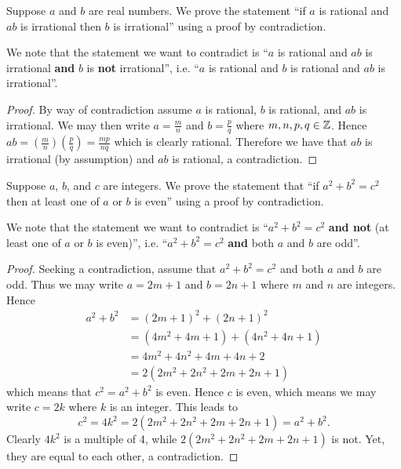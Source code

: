 \begin{example}
    Suppose $a$ and $b$ are real numbers. We prove the statement ``if $a$ is rational and $ab$ is irrational then $b$ is irrational'' using a proof by contradiction.

    We note that the statement we want to contradict is ``$a$ is rational and $ab$ is irrational \textbf{and} $b$ is \textbf{not} irrational'', i.e. ``$a$ is rational and $b$ is rational and $ab$ is irrational''.
    \begin{proof}
        By way of contradiction assume $a$ is rational, $b$ is rational, and $ab$ is irrational. We may then write $a = \frac mn$ and $b = \frac pq$ where $m, n, p, q \in \mathbb{Z}$. Hence $ab = \left(\frac mn\right)\left(\frac pq\right) = \frac{mp}{nq}$ which is clearly rational. Therefore we have that $ab$ is irrational (by assumption) and $ab$ is rational, a contradiction.
    \end{proof}
\end{example}

\begin{example}
    Suppose $a$, $b$, and $c$ are integers. We prove the statement that ``if $a^2 + b^2 = c^2$ then at least one of $a$ or $b$ is even'' using a proof by contradiction.

    We note that the statement we want to contradict is ``$a^2 + b^2 = c^2$ \textbf{and not} (at least one of $a$ or $b$ is even)'', i.e. ``$a^2 + b^2 = c^2$ \textbf{and} both $a$ and $b$ are odd''.
    \begin{proof}
        Seeking a contradiction, assume that $a^2 + b^2 = c^2$ and both $a$ and $b$ are odd. Thus we may write $a = 2m + 1$ and $b = 2n + 1$ where $m$ and $n$ are integers. Hence
        \begin{align*}
            a^2 + b^2 &= (2m+1)^2 + (2n+1)^2\\
            &= (4m^2+4m+1) + (4n^2+4n+1)\\
            &= 4m^2 + 4n^2 + 4m + 4n + 2\\
            &= 2(2m^2 + 2n^2 + 2m + 2n +1)
        \end{align*}
        which means that $c^2 = a^2 + b^2$ is even. Hence $c$ is even, which means we may write $c = 2k$ where $k$ is an integer. This leads to
        \[
            c^2 = 4k^2 = 2(2m^2 + 2n^2 + 2m + 2n + 1) = a^2 + b^2.
        \]
        Clearly $4k^2$ is a multiple of 4, while $2(2m^2 + 2n^2 + 2m + 2n + 1)$ is not. Yet, they are equal to each other, a contradiction.
    \end{proof}
\end{example}

